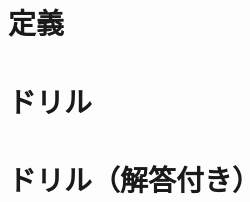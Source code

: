 \documentclass[dvipdfmx,uplatex]{jsarticle}
\title{}
\author{}
\date{\today}
\begin{document}
\maketitle
\section{定義}
\section{ドリル}
\section{ドリル（解答付き）}
\end{document}

